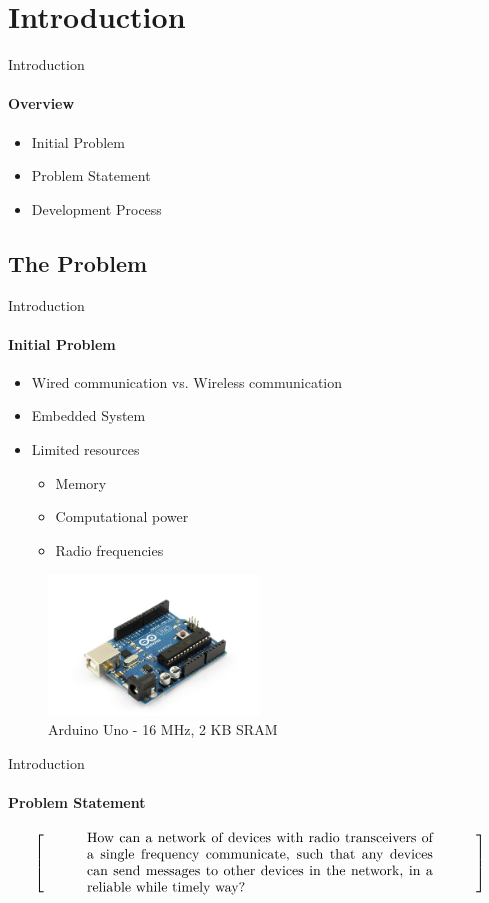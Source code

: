 \section{Introduction}
\begin{frame}{Introduction}\framesubtitle{Overview}
    \begin{itemize}
        \item Initial Problem
        \item Problem Statement
        \item Development Process 
    \end{itemize}
\end{frame}
\subsection{The Problem}
\begin{frame}[t]{Introduction}\framesubtitle{Initial Problem}
	\begin{itemize}
        \item Wired communication vs. Wireless communication
        \item Embedded System 
        \item Limited resources
            \begin{itemize}
                \item Memory
                \item Computational power
                \item Radio frequencies
            \end{itemize}
    \end{itemize}
    \begin{figure}
        \includegraphics[width=0.5\textwidth,trim={3cm 0.5cm 3cm 3cm},clip]{images/arduino_uno.jpg}
        \caption{Arduino Uno - 16 MHz, 2 KB SRAM}
    \end{figure}
\end{frame}
\begin{frame}{Introduction}\framesubtitle{Problem Statement}
\[
\left[
\begin{minipage}{0.9\textwidth}
\centering
\begin{minipage}{0.8\textwidth}
How can a network of devices with radio transceivers of a single frequency communicate, such that any devices can send messages to other devices in the network, in a reliable while timely way?
\end{minipage}
\end{minipage}
\right]
\]
\end{frame}

